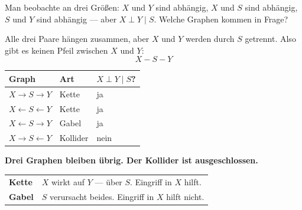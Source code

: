 \begin{aufgabe}
Man beobachte an drei Größen: $X$ und $Y$ sind abhängig, $X$ und $S$ sind abhängig, $S$ und $Y$ sind abhängig --- aber $X \perp Y \mid S$. Welche Graphen kommen in Frage?

\loesung
{}
Alle drei Paare hängen zusammen, aber $X$ und $Y$ werden durch $S$ getrennt. Also gibt es keinen Pfeil zwischen $X$ und $Y$:
\[ X - S - Y \]

\begin{center}
{\small
\renewcommand{\arraystretch}{1.48}
\begin{tabular}{@{}P{3.0cm}P{2.4cm}P{2.6cm}@{}}
\toprule
\textbf{Graph} & \textbf{Art} & $X \perp Y \mid S$?\\
\midrule
$X \to S \to Y$ & Kette & \textcolor{gruen}{ja}\\
$X \leftarrow S \leftarrow Y$ & Kette & \textcolor{gruen}{ja}\\
$X \leftarrow S \to Y$ & Gabel & \textcolor{gruen}{ja}\\
$X \to S \leftarrow Y$ & Kollider & nein\\
\bottomrule
\end{tabular}}
\end{center}

\begin{center}
\begin{minipage}{0.9\textwidth}
\textbf{Drei Graphen bleiben übrig. Der Kollider ist ausgeschlossen.}
\end{minipage}
\end{center}

\begin{center}
{\small
\renewcommand{\arraystretch}{1.5}
\begin{tabular}{@{}P{2.8cm}P{5.8cm}@{}}
\toprule
\textbf{Kette} & $X$ wirkt auf $Y$ --- über $S$. Eingriff in $X$ hilft.\\
\textbf{Gabel} & $S$ verursacht beides. Eingriff in $X$ hilft nicht.\\
\bottomrule
\end{tabular}}
\end{center}

\begin{center}
\begin{minipage}{0.88\textwidth}
\end{minipage}
\end{center}


\end{aufgabe}
